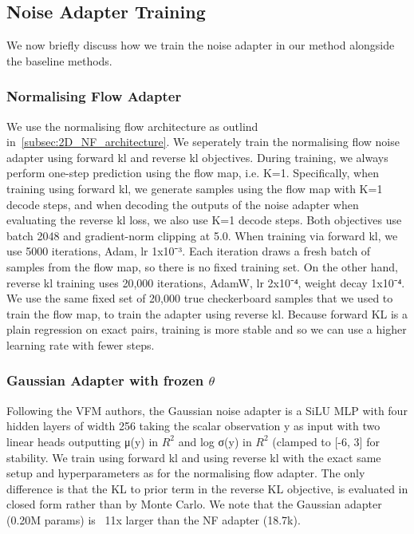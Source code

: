\documentclass[12pt,a4paper]{report}
\begin{document}
\subsection{Noise Adapter Training}
We now briefly discuss how we train the noise adapter in our method alongside the baseline methods. 

\subsubsection{Normalising Flow Adapter}
We use the normalising flow architecture as outlind in~\ref{subsec:2D_NF_architecture}. We seperately train the normalising flow noise adapter using forward kl and reverse kl objectives. 
During training, we always perform one-step prediction using the flow map, i.e. K=1. 
Specifically, when training using forward kl, we generate samples using the flow map with K=1 decode steps, and when decoding the outputs of the noise adapter when evaluating the reverse kl loss, we also use K=1 decode steps. 
Both objectives use batch 2048 and gradient-norm clipping at 5.0. 
When training via forward kl, we use 5000 iterations, Adam, lr 1x10⁻³. Each iteration draws a fresh batch of samples from the flow map, so there is no fixed training set. 
On the other hand, reverse kl training uses 20,000 iterations, AdamW, lr 2x10⁻⁴, weight decay 1x10⁻⁴. 
We use the same fixed set of 20,000 true checkerboard samples that we used to train the flow map, to train the adapter using reverse kl. 
Because forward KL is a plain regression on exact pairs, training is more stable and so we can use a higher learning rate with fewer steps. 

\subsubsection{Gaussian Adapter with frozen $\theta$}
Following the VFM authors, the Gaussian noise adapter is a SiLU MLP with four hidden layers of width 256 taking the scalar observation y as input with two linear heads outputting μ(y) in $R^2$ and log σ(y) in $R^2$ (clamped to [-6, 3] for stability. 
We train using forward kl and using reverse kl with the exact same setup and hyperparameters as for the normalising flow adapter. The only difference is that the KL to prior term in the reverse KL objective, is evaluated in closed form rather than by Monte Carlo. 
We note that the Gaussian adapter (0.20M params) is ~11x larger than the NF adapter (18.7k). 
\end{document}
